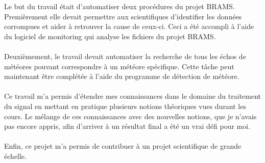 \documentclass[11pt]{article}
\begin{document}
Le but du travail était d'automatiser deux procédures du projet BRAMS.
Premièrement elle devait permettre aux scientifiques d'identifier les données corrompues et aider à retrouver la cause de ceux-ci.
Ceci a été accompli à l'aide du logiciel de monitoring qui analyse les fichiers du projet BRAMS.\\
\\
Deuxièmement, le travail devait automatiser la recherche de tous les échos de météores pouvant correspondre à un météore spécifique.
Cette tâche peut maintenant être complétée à l'aide du programme de détection de météore.\\
\\
Ce travail m'a permis d'étendre mes connaissances dans le domaine du traitement du signal en mettant en pratique plusieurs notions théoriques vues durant les cours.
Le mélange de ces connaissances avec des nouvelles notions, que je n'avais pas encore appris, afin d'arriver à un résultat final a été un vrai défi pour moi.\\
\\
Enfin, ce projet m'a permis de contribuer à un projet scientifique de grande échelle.

\newpage
\end{document}
